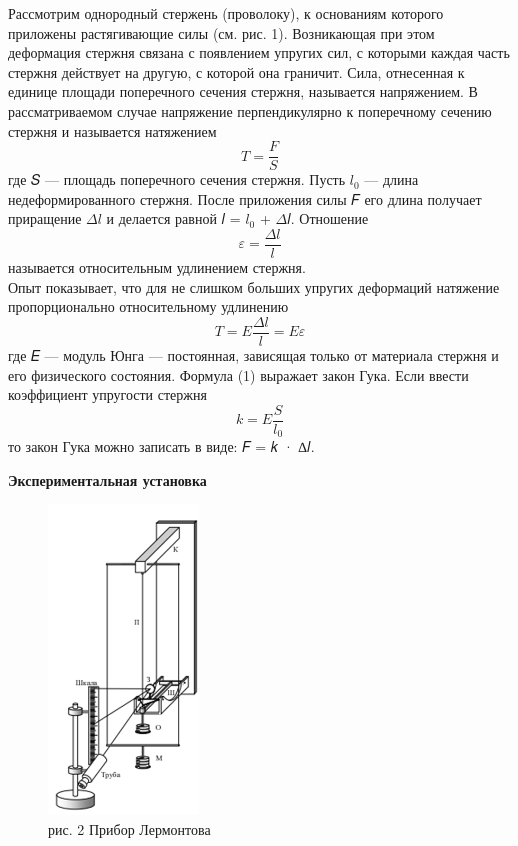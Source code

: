 \documentclass[12pt]{article}
\begin{document}
	
	Рассмотрим однородный стержень (проволоку), к
	основаниям которого приложены растягивающие силы (см. рис. 1). Возникающая при этом деформация
	стержня связана с появлением упругих сил, с которыми каждая часть стержня действует на другую, с которой она граничит. Сила, отнесенная к единице площади	поперечного сечения стержня, называется напряжением. В рассматриваемом случае напряжение перпендикулярно к поперечному сечению стержня и называется натяжением
	$$T = \frac{F}{S}$$
	где 𝑆 — площадь поперечного сечения стержня. Пусть $𝑙_0$ — длина недеформированного стержня. После приложения силы 𝐹 его длина получает приращение $\Delta l$ и делается равной 𝑙 = $𝑙_0$ + $\Delta$𝑙. Отношение
	$$\varepsilon = \frac{\Delta l}{l}$$ называется относительным удлинением стержня.\\
	Опыт показывает, что для не слишком больших упругих деформаций натяжение пропорционально относительному удлинению
	\begin{equation}
	T = E\frac{\Delta l}{l} = E\varepsilon
	\end{equation}
	где 𝐸 — модуль Юнга — постоянная, зависящая только от материала
	стержня и его физического состояния. Формула (1) выражает закон
	Гука. Если ввести коэффициент упругости стержня
	\begin{equation}
	k = E\frac{S}{l_0}
	\end{equation}
	то закон Гука можно записать в виде: 𝐹 = 𝑘 · ∆𝑙.
	\begin{center}
		\textbf{Экспериментальная установка}
	\end{center}
	
	\begin{figure}
		\includegraphics[width=4cm]{6_2} \\ рис. 2 Прибор Лермонтова
	\end{figure}
	
\end{document}
